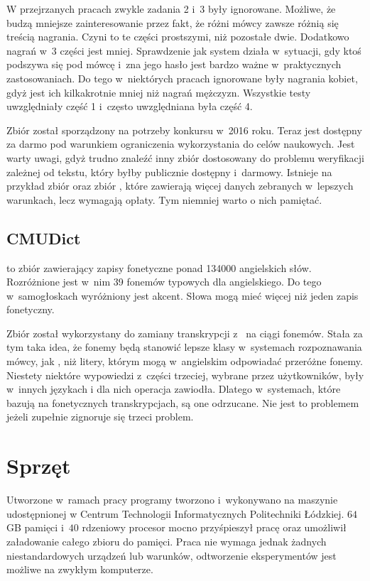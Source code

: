 W przejrzanych pracach zwykle zadania 2 i~3 były ignorowane. Możliwe, że budzą mniejsze zainteresowanie przez fakt,
że różni mówcy zawsze różnią się treścią nagrania. Czyni to te części prostszymi, niż pozostałe dwie.
Dodatkowo nagrań w~3 części jest mniej.
Sprawdzenie jak system działa w~sytuacji, gdy ktoś podszywa się pod mówcę i~zna jego hasło jest bardzo
ważne w~praktycznych zastosowaniach.  Do tego w~niektórych pracach ignorowane
były nagrania kobiet, gdyż jest ich kilkakrotnie mniej niż nagrań mężczyzn.
Wszystkie testy uwzględniały część 1 i~często uwzględniana była część 4.

Zbiór został sporządzony na potrzeby konkursu w~2016 roku. Teraz jest dostępny za darmo pod warunkiem
ograniczenia wykorzystania do celów naukowych. Jest warty uwagi, gdyż trudno znaleźć inny
zbiór dostosowany do problemu weryfikacji zależnej od tekstu, który byłby publicznie dostępny i~darmowy.
Istnieje na przykład zbiór  oraz zbiór , które
zawierają więcej danych zebranych w~lepszych warunkach, lecz wymagają opłaty. Tym niemniej warto
o nich pamiętać.

\subsection{CMUDict}

\cite{TheCMUPronouncing} to zbiór zawierający zapisy fonetyczne ponad 134000 angielskich słów.
Rozróżnione jest w~nim 39 fonemów typowych dla angielskiego. Do tego w~samogłoskach wyróżniony jest akcent.
Słowa mogą mieć więcej niż jeden zapis fonetyczny.

Zbiór został wykorzystany do zamiany transkrypcji z~ na ciągi fonemów. Stała
za tym taka idea, że fonemy będą stanowić lepsze klasy w~systemach rozpoznawania mówcy, jak
, niż litery, którym mogą w~angielskim odpowiadać przeróżne fonemy.
Niestety niektóre wypowiedzi z~części trzeciej, wybrane przez użytkowników, były w~innych językach
i dla nich operacja zawiodła. Dlatego w~systemach, które bazują na fonetycznych transkrypcjach,
są one odrzucane. Nie jest to problemem jeżeli zupełnie zignoruje się trzeci problem.

\section{Sprzęt}\label{sec:sprzet}

Utworzone w~ramach pracy programy tworzono i~wykonywano na maszynie udostępnionej
w Centrum Technologii Informatycznych Politechniki Łódzkiej. $64$GB pamięci i~$40$ rdzeniowy
procesor mocno przyśpieszył pracę oraz umożliwił załadowanie całego zbioru do pamięci.
Praca nie wymaga jednak żadnych niestandardowych urządzeń lub warunków, odtworzenie eksperymentów
jest możliwe na zwykłym komputerze.

